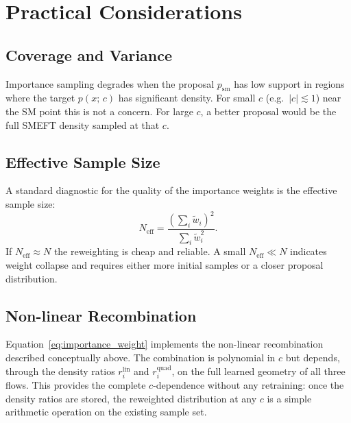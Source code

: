 \documentclass[11pt, a4paper]{article}
\begin{document}
\section{Practical Considerations}

\subsection{Coverage and Variance}

Importance sampling degrades when the proposal $p_\mathrm{sm}$ has low support in
regions where the target $p(x;\, c)$ has significant density.
For small $c$ (e.g.\ $|c| \lesssim 1$) near the SM point this is not a concern.
For large $c$, a better proposal would be the full SMEFT density sampled at that $c$.

\subsection{Effective Sample Size}

A standard diagnostic for the quality of the importance weights is the effective
sample size:
\begin{equation}
    N_\mathrm{eff} = \frac{\left(\sum_i \tilde{w}_i\right)^2}{\sum_i \tilde{w}_i^2}.
\end{equation}
If $N_\mathrm{eff} \approx N$ the reweighting is cheap and reliable.
A small $N_\mathrm{eff} \ll N$ indicates weight collapse and requires either more
initial samples or a closer proposal distribution.

\subsection{Non-linear Recombination}

Equation~\eqref{eq:importance_weight} implements the non-linear recombination
described conceptually above.
The combination is polynomial in $c$ but depends, through the density ratios
$r_i^\mathrm{lin}$ and $r_i^\mathrm{quad}$, on the full learned geometry of all
three flows.
This provides the complete $c$-dependence without any retraining: once the
density ratios are stored, the reweighted distribution at any $c$ is a simple
arithmetic operation on the existing sample set.
\end{document}
